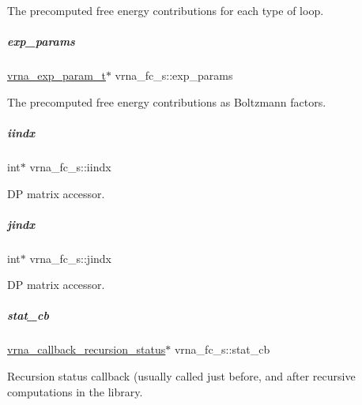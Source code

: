 The precomputed free energy contributions for each type of loop. 

\mbox{\label{group__fold__compound_a7052a5d24f6091b9c5f79edcc9456a12}} 
\subparagraph{\texorpdfstring{exp\+\_\+params}{exp\_params}}
{\footnotesize\ttfamily \mbox{\hyperlink{group__energy__parameters_ga01d8b92fe734df8d79a6169482c7d8d8}{vrna\+\_\+exp\+\_\+param\+\_\+t}}$\ast$ vrna\+\_\+fc\+\_\+s\+::exp\+\_\+params}



The precomputed free energy contributions as Boltzmann factors. 

\mbox{\label{group__fold__compound_afdead4cf55c882d3497e779573e17e03}} 
\subparagraph{\texorpdfstring{iindx}{iindx}}
{\footnotesize\ttfamily int$\ast$ vrna\+\_\+fc\+\_\+s\+::iindx}



DP matrix accessor. 

\mbox{\label{group__fold__compound_a5037235dee512efd85ca543780bbca1a}} 
\subparagraph{\texorpdfstring{jindx}{jindx}}
{\footnotesize\ttfamily int$\ast$ vrna\+\_\+fc\+\_\+s\+::jindx}



DP matrix accessor. 

\mbox{\label{group__fold__compound_a87a83f6795b569000efcbe65acc3dd81}} 
\subparagraph{\texorpdfstring{stat\+\_\+cb}{stat\_cb}}
{\footnotesize\ttfamily \mbox{\hyperlink{group__fold__compound_gac86036fa8cad1108832335063243cdc8}{vrna\+\_\+callback\+\_\+recursion\+\_\+status}}$\ast$ vrna\+\_\+fc\+\_\+s\+::stat\+\_\+cb}



Recursion status callback (usually called just before, and after recursive computations in the library. 

